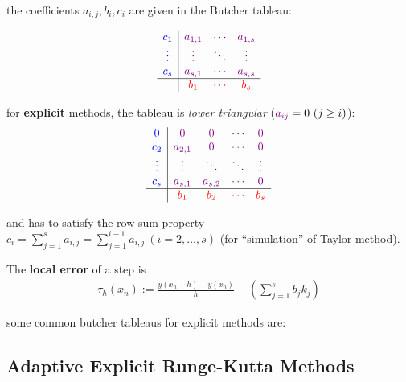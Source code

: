 the coefficients $a_{i,j},b_i,c_i$ are given in the Butcher tableau:

\begin{snugshade*}
    \begin{align*}
        \begin{array}{c|ccc}
            {\color{blue}c_1}    & {\color{purple}a_{1,1}} & {\color{purple}\cdots} & {\color{purple}a_{1,s}} \\
            {\color{blue}\vdots} & {\color{purple}\vdots}  & {\color{purple}\ddots} & {\color{purple}\vdots}  \\
            {\color{blue}c_s}    & {\color{purple}a_{s,1}} & {\color{purple}\cdots} & {\color{purple}a_{s,s}} \\
            \hline
            & {\color{red}b_1}     & {\color{red}\cdots} & {\color{red}b_s}
        \end{array}
    \end{align*}
\end{snugshade*}

for \textbf{explicit} methods, the tableau is \emph{lower triangular} (${\color{purple}a_{ij}} = 0\ (j \geq i)$):
\begin{align*}
    \begin{array}{c|cccc}
        {\color{blue}0}      & {\color{purple}0}       & {\color{purple}0}       & {\color{purple}\cdots} & {\color{purple}0}      \\
        {\color{blue}c_2}    & {\color{purple}a_{2,1}} & {\color{purple}0}       & {\color{purple}\cdots} & {\color{purple}0}      \\
        {\color{blue}\vdots} & {\color{purple}\vdots}  & {\color{purple}\ddots}  & {\color{purple}\ddots} & {\color{purple}\vdots} \\
        {\color{blue}c_s}    & {\color{purple}a_{s,1}} & {\color{purple}a_{s,2}} & {\color{purple}\cdots} & {\color{purple}0}      \\
        \hline
        & {\color{red}b_1}     & {\color{red}b_2}     & {\color{red}\cdots} & {\color{red}b_s}
    \end{array}
\end{align*}

and has to satisfy the row-sum property $c_i = \sum_{j=1}^{s}a_{i,j} = \sum_{j=1}^{i-1}a_{i,j}\ (i=2,\ldots,s)$
(for ``simulation'' of Taylor method).

The \textbf{local error} of a step is
\begin{align*}
    \tau_{h}(x_{n}) := \frac{y(x_{n}+h)-y(x_{n})}{h}-\left(\sum_{j=1}^{s}b_{j}k_{j}\right)
\end{align*}

some common butcher tableaus for explicit methods are:


\subsection{Adaptive Explicit Runge-Kutta Methods}

